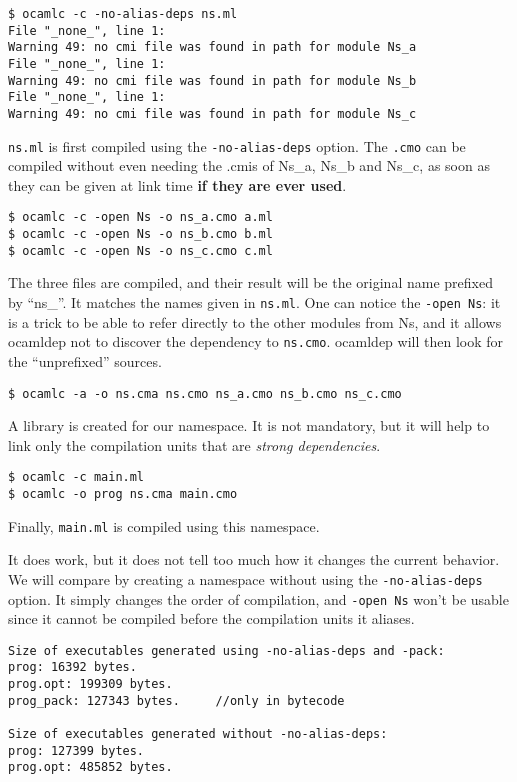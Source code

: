 \documentclass[11pt,a4paper]{article}
\begin{document}
\begin{verbatim}
$ ocamlc -c -no-alias-deps ns.ml
File "_none_", line 1:
Warning 49: no cmi file was found in path for module Ns_a
File "_none_", line 1:
Warning 49: no cmi file was found in path for module Ns_b
File "_none_", line 1:
Warning 49: no cmi file was found in path for module Ns_c
\end{verbatim}

\texttt{ns.ml} is first compiled using the \texttt{-no-alias-deps} option. The
\texttt{.cmo} can be compiled without even needing the .cmis of Ns\_a, Ns\_b and
Ns\_c, as soon as they can be given at link time \textbf{if they are ever
  used}.

\begin{verbatim}
$ ocamlc -c -open Ns -o ns_a.cmo a.ml
$ ocamlc -c -open Ns -o ns_b.cmo b.ml
$ ocamlc -c -open Ns -o ns_c.cmo c.ml
\end{verbatim}

The three files are compiled, and their result will be the original name
prefixed by ``ns\_''. It matches the names given in \texttt{ns.ml}. One can
notice the \texttt{-open Ns}: it is a trick to be able to refer directly to the
other modules from Ns, and it allows ocamldep not to discover the dependency to
\texttt{ns.cmo}. ocamldep will then look for the ``unprefixed'' sources. 

\begin{verbatim}
$ ocamlc -a -o ns.cma ns.cmo ns_a.cmo ns_b.cmo ns_c.cmo
\end{verbatim}

A library is created for our namespace. It is not mandatory, but it will help to
link only the compilation units that are \emph{strong dependencies}.

\begin{verbatim}
$ ocamlc -c main.ml
$ ocamlc -o prog ns.cma main.cmo
\end{verbatim}

Finally, \texttt{main.ml} is compiled using this namespace.

It does work, but it does not tell too much how it changes the current
behavior. We will compare by creating a namespace without using the
\texttt{-no-alias-deps} option. It simply changes the order of compilation, and
\texttt{-open Ns} won't be usable since it cannot be compiled before the
compilation units it aliases.

\begin{verbatim}
Size of executables generated using -no-alias-deps and -pack:
prog: 16392 bytes.
prog.opt: 199309 bytes.
prog_pack: 127343 bytes.     //only in bytecode

Size of executables generated without -no-alias-deps:
prog: 127399 bytes.
prog.opt: 485852 bytes.
\end{verbatim}
\end{document}
